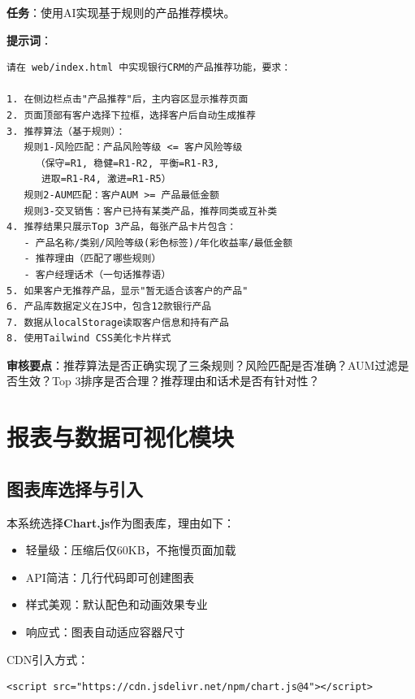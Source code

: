 \begin{practicebox}[用AI实现推荐引擎]
\textbf{任务}：使用AI实现基于规则的产品推荐模块。

\textbf{提示词}：

\begin{lstlisting}
请在 web/index.html 中实现银行CRM的产品推荐功能，要求：

1. 在侧边栏点击"产品推荐"后，主内容区显示推荐页面
2. 页面顶部有客户选择下拉框，选择客户后自动生成推荐
3. 推荐算法（基于规则）：
   规则1-风险匹配：产品风险等级 <= 客户风险等级
     （保守=R1, 稳健=R1-R2, 平衡=R1-R3,
      进取=R1-R4, 激进=R1-R5）
   规则2-AUM匹配：客户AUM >= 产品最低金额
   规则3-交叉销售：客户已持有某类产品，推荐同类或互补类
4. 推荐结果只展示Top 3产品，每张产品卡片包含：
   - 产品名称/类别/风险等级(彩色标签)/年化收益率/最低金额
   - 推荐理由（匹配了哪些规则）
   - 客户经理话术（一句话推荐语）
5. 如果客户无推荐产品，显示"暂无适合该客户的产品"
6. 产品库数据定义在JS中，包含12款银行产品
7. 数据从localStorage读取客户信息和持有产品
8. 使用Tailwind CSS美化卡片样式
\end{lstlisting}

\textbf{审核要点}：推荐算法是否正确实现了三条规则？风险匹配是否准确？AUM过滤是否生效？Top 3排序是否合理？推荐理由和话术是否有针对性？
\end{practicebox}

\section{报表与数据可视化模块}

\subsection{图表库选择与引入}

本系统选择\textbf{Chart.js}作为图表库，理由如下：
\begin{itemize}[leftmargin=2em]
  \item 轻量级：压缩后仅60KB，不拖慢页面加载
  \item API简洁：几行代码即可创建图表
  \item 样式美观：默认配色和动画效果专业
  \item 响应式：图表自动适应容器尺寸
\end{itemize}

CDN引入方式：

\begin{lstlisting}[style=html]
<script src="https://cdn.jsdelivr.net/npm/chart.js@4"></script>
\end{lstlisting}

